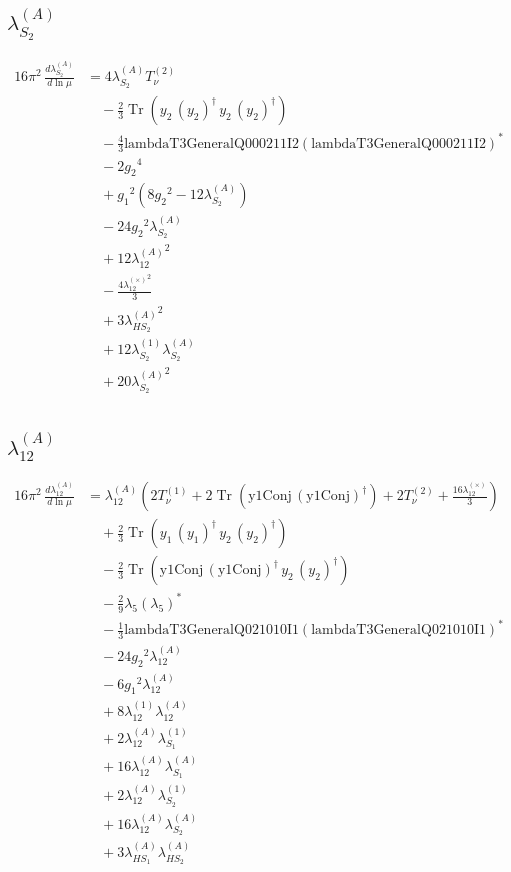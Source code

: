 \documentclass[10pt,a4paper]{article}
\begin{document}
\subsection*{$\lambda_{S_2}^{(A)}$}
\begin{align*}
16\pi^2\,\frac{d \lambda_{S_2}^{(A)}}{d\ln\mu} &=4 {\lambda_{S_2}^{(A)}} T_{\nu}^{(2)} \\
&\quad -\frac{2}{3} \operatorname{Tr}\!\left({y_2}\,\left({y_2}\right)^{\dagger}\,{y_2}\,\left({y_2}\right)^{\dagger}\right) \\
&\quad -\frac{4}{3} \text{lambdaT3GeneralQ000211I2} \left(\text{lambdaT3GeneralQ000211I2}\right)^{*} \\
&\quad -2 {g_2}^4 \\
&\quad +{g_1}^2 \left(8 {g_2}^2-12 {\lambda_{S_2}^{(A)}}\right) \\
&\quad -24 {g_2}^2 {\lambda_{S_2}^{(A)}} \\
&\quad +12 {\lambda_{12}^{(A)}}^2 \\
&\quad -\frac{4 {\lambda_{12}^{(\times)}}^2}{3} \\
&\quad +3 {\lambda_{HS_2}^{(A)}}^2 \\
&\quad +12 {\lambda_{S_2}^{(1)}} {\lambda_{S_2}^{(A)}} \\
&\quad +20 {\lambda_{S_2}^{(A)}}^2 \\
\end{align*}
\subsection*{$\lambda_{12}^{(A)}$}
\begin{align*}
16\pi^2\,\frac{d \lambda_{12}^{(A)}}{d\ln\mu} &={\lambda_{12}^{(A)}} \left(2 T_{\nu}^{(1)}+2 \operatorname{Tr}\!\left(\text{y1Conj}\,\left(\text{y1Conj}\right)^{\dagger}\right)+2 T_{\nu}^{(2)}+\frac{16 {\lambda_{12}^{(\times)}}}{3}\right) \\
&\quad +\frac{2}{3} \operatorname{Tr}\!\left({y_1}\,\left({y_1}\right)^{\dagger}\,{y_2}\,\left({y_2}\right)^{\dagger}\right) \\
&\quad -\frac{2}{3} \operatorname{Tr}\!\left(\text{y1Conj}\,\left(\text{y1Conj}\right)^{\dagger}\,{y_2}\,\left({y_2}\right)^{\dagger}\right) \\
&\quad -\frac{2}{9} {\lambda_5} \left({\lambda_5}\right)^{*} \\
&\quad -\frac{1}{3} \text{lambdaT3GeneralQ021010I1} \left(\text{lambdaT3GeneralQ021010I1}\right)^{*} \\
&\quad -24 {g_2}^2 {\lambda_{12}^{(A)}} \\
&\quad -6 {g_1}^2 {\lambda_{12}^{(A)}} \\
&\quad +8 {\lambda_{12}^{(1)}} {\lambda_{12}^{(A)}} \\
&\quad +2 {\lambda_{12}^{(A)}} {\lambda_{S_1}^{(1)}} \\
&\quad +16 {\lambda_{12}^{(A)}} {\lambda_{S_1}^{(A)}} \\
&\quad +2 {\lambda_{12}^{(A)}} {\lambda_{S_2}^{(1)}} \\
&\quad +16 {\lambda_{12}^{(A)}} {\lambda_{S_2}^{(A)}} \\
&\quad +3 {\lambda_{HS_1}^{(A)}} {\lambda_{HS_2}^{(A)}} \\
\end{align*}
\end{document}
